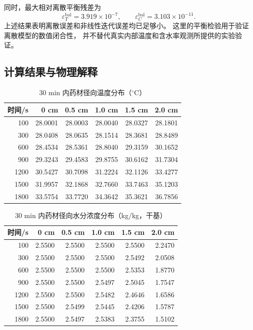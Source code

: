 \documentclass[UTF8,a4paper,12pt]{ctexart}
\begin{document}
同时，最大相对离散平衡残差为
\[
\varepsilon_T^{\mathrm{bal}}
=3.919\times10^{-7},
\qquad
\varepsilon_C^{\mathrm{bal}}
=3.103\times10^{-11}.
\]
上述结果表明离散误差和非线性迭代误差均已足够小。
这里的平衡检验用于验证离散模型的数值闭合性，
并不替代真实内部温度和含水率观测所提供的实验验证。

\subsection{计算结果与物理解释}

\begin{table}[H]
\centering
\caption{30 min 内药材径向温度分布（$^\circ$C）}
\begin{tabular}{rrrrrr}
\toprule
时间/s & 0 cm & 0.5 cm & 1.0 cm & 1.5 cm & 2.0 cm\\
\midrule
100  & 28.0001 & 28.0003 & 28.0040 & 28.0327 & 28.1801\\
300  & 28.0408 & 28.0635 & 28.1514 & 28.3681 & 28.8489\\
600  & 28.4534 & 28.5361 & 28.8040 & 29.3159 & 30.1652\\
900  & 29.3243 & 29.4583 & 29.8755 & 30.6162 & 31.7304\\
1200 & 30.5427 & 30.7098 & 31.2224 & 32.1126 & 33.4277\\
1500 & 31.9957 & 32.1868 & 32.7660 & 33.7463 & 35.1203\\
1800 & 33.5754 & 33.7720 & 34.3642 & 35.3621 & 36.7856\\
\bottomrule
\end{tabular}
\end{table}

\begin{table}[H]
\centering
\caption{30 min 内药材径向水分浓度分布（kg/kg，干基）}
\begin{tabular}{rrrrrr}
\toprule
时间/s & 0 cm & 0.5 cm & 1.0 cm & 1.5 cm & 2.0 cm\\
\midrule
100  & 2.5500 & 2.5500 & 2.5500 & 2.5500 & 2.2470\\
300  & 2.5500 & 2.5500 & 2.5500 & 2.5492 & 2.0508\\
600  & 2.5500 & 2.5500 & 2.5500 & 2.5353 & 1.8770\\
900  & 2.5500 & 2.5500 & 2.5497 & 2.5045 & 1.7547\\
1200 & 2.5500 & 2.5500 & 2.5482 & 2.4646 & 1.6586\\
1500 & 2.5500 & 2.5499 & 2.5445 & 2.4206 & 1.5787\\
1800 & 2.5500 & 2.5497 & 2.5383 & 2.3755 & 1.5102\\
\bottomrule
\end{tabular}
\end{table}
\end{document}
